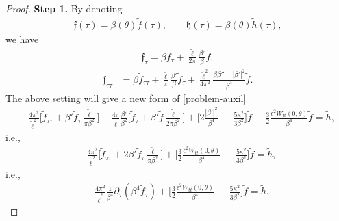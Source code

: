 \documentclass[10pt, reqno]{amsart}
\numberwithin{equation}{section}
\theoremstyle{definition}
\def\p{\partial}
\begin{document}
{\begin{proof}
{\bf{Step 1.}}
By denoting
\begin{align}
{\mathfrak f}(\tau) = \beta(\theta) {\tilde f}(\tau), \qquad {\mathfrak h}(\tau) = \beta(\theta){\tilde h}(\tau),
\label{setting1}
\end{align}
we have
\begin{align}
{\mathfrak f}_\tau = \beta {\tilde f}_\tau + \frac{\tilde\ell}{2\pi}\frac{\beta'}{\beta} {\tilde f},
\label{setting2}
\end{align}
\begin{align}
{\mathfrak f}_{\tau\tau}
& = \beta {\tilde f}_{\tau\tau}
+ \frac{\tilde\ell}{\pi}\frac{\beta'}{\beta} {\tilde f}_\tau
+ \frac{\tilde\ell^2} {4\pi^2} \frac{\beta\beta''- |\beta'|^2}{\beta^3} {\tilde f}.
\label{setting3}
\end{align}
The above setting will give a new form of \eqref{problem-auxil}
\begin{align*}
- \frac{4\pi^2}{{\tilde\ell}^2}\Big[ {\tilde f}_{\tau\tau} + \beta' {\tilde f}_\tau \frac{\tilde\ell} {\pi \beta^2} \Big]
- \frac{4\pi}{\tilde\ell} \frac{\beta'}{\beta^2} \Big[{\tilde f}_\tau + \beta' {\tilde f} \frac{\tilde\ell} {2\pi \beta^2}\Big]
+\Big[2\frac{|\beta'|^2}{\beta^4}\,-\,\frac{5\kappa^2}{3\beta^2} \Big]{\tilde f} + \, \frac 32\frac{\epsilon^2 W_{tt}(0, \theta)}{\beta^4}{\tilde f}
= {\tilde h},
\end{align*}
i.e.,
\begin{align*}
- \frac{4\pi^2}{{\tilde\ell}^2}\Big[ {\tilde f}_{\tau\tau} +2 \beta' {\tilde f}_\tau \frac{\tilde\ell} {\pi \beta^2} \Big]
+
\Big[\frac 32\frac{\epsilon^2 W_{tt}(0, \theta)}{\beta^4}\,-\,\frac{5\kappa^2}{3\beta^2} \Big]{\tilde f}
= {\tilde h},
\end{align*}
i.e.,
\begin{align*}
 - \frac{4\pi^2}{{\tilde\ell}^2} \frac 1{ \beta^4} \p_\tau \left( \beta^4 {\tilde f}_\tau \right)
+
\Big[\frac 32\frac{\epsilon^2 W_{tt}(0, \theta)}{\beta^4}\,-\,\frac{5\kappa^2}{3\beta^2} \Big]{\tilde f}
= {\tilde h}.
\end{align*}


\end{proof}}
\end{document}
